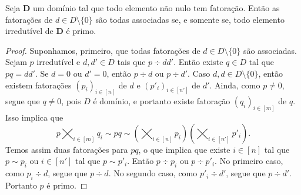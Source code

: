 \begin{prop}
Seja $\bm D$ um domínio tal que todo elemento não nulo tem fatoração. Então as fatorações de $d \in D \setminus \{0\}$ são todas associadas se, e somente se, todo elemento irredutível de $\bm D$ é primo.
\end{prop}
\begin{proof}
Suponhamos, primeiro, que todas fatorações de $d \in D \setminus \{0\}$ são associadas. Sejam $p$ irredutível e $d,d' \in D$ tais que $p \div dd'$. Então existe $q \in D$ tal que $pq=dd'$. Se $d=0$ ou $d'=0$, então $p \div d$ ou $p \div d'$. Caso $d,d \in D \setminus \{0\}$, então existem fatorações $(p_i)_{i \in [n]}$ de $d$ e $(p'_i)_{i \in [n']}$ de $d'$. Ainda, como $p \neq 0$, segue que $q \neq 0$, pois $D$ é domínio, e portanto existe fatoração $(q_i)_{i \in [m]}$ de $q$. Isso implica que
	\begin{equation*}
	p \bigtimes_{i \in [m]} q_i \sim pq \sim \left( \bigtimes_{i \in [n]} p_i \right) \left( \bigtimes_{i \in [n']} p'_i \right).
	\end{equation*}
Temos assim duas fatorações para $pq$, o que implica que existe $i \in [n]$ tal que $p \sim p_i$ ou $i \in [n']$ tal que $p \sim p'_i$. Então $p \div p_i$ ou $p \div p'_i$. No primeiro caso, como $p_i \div d$, segue que $p \div d$. No segundo caso, como $p'_i \div d'$, segue que $p \div d'$. Portanto $p$ é primo.


\end{proof}
